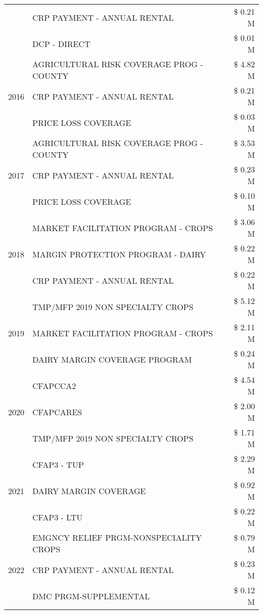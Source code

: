 \begin{tabular}{llr}
 & CRP PAYMENT - ANNUAL RENTAL & \$ 0.21 M \\
 & DCP - DIRECT & \$ 0.01 M \\
\cline{1-3}
\multirow[t]{3}{*}{2016} & AGRICULTURAL RISK COVERAGE PROG - COUNTY & \$ 4.82 M \\
 & CRP PAYMENT - ANNUAL RENTAL & \$ 0.21 M \\
 & PRICE LOSS COVERAGE & \$ 0.03 M \\
\cline{1-3}
\multirow[t]{3}{*}{2017} & AGRICULTURAL RISK COVERAGE PROG - COUNTY & \$ 3.53 M \\
 & CRP PAYMENT - ANNUAL RENTAL & \$ 0.23 M \\
 & PRICE LOSS COVERAGE & \$ 0.10 M \\
\cline{1-3}
\multirow[t]{3}{*}{2018} & MARKET FACILITATION PROGRAM - CROPS & \$ 3.06 M \\
 & MARGIN PROTECTION PROGRAM - DAIRY & \$ 0.22 M \\
 & CRP PAYMENT - ANNUAL RENTAL & \$ 0.22 M \\
\cline{1-3}
\multirow[t]{3}{*}{2019} & TMP/MFP 2019 NON SPECIALTY CROPS & \$ 5.12 M \\
 & MARKET FACILITATION PROGRAM - CROPS & \$ 2.11 M \\
 & DAIRY MARGIN COVERAGE PROGRAM & \$ 0.24 M \\
\cline{1-3}
\multirow[t]{3}{*}{2020} & CFAPCCA2 & \$ 4.54 M \\
 & CFAPCARES & \$ 2.00 M \\
 & TMP/MFP 2019 NON SPECIALTY CROPS & \$ 1.71 M \\
\cline{1-3}
\multirow[t]{3}{*}{2021} & CFAP3 - TUP & \$ 2.29 M \\
 & DAIRY MARGIN COVERAGE & \$ 0.92 M \\
 & CFAP3 - LTU & \$ 0.22 M \\
\cline{1-3}
\multirow[t]{3}{*}{2022} & EMGNCY RELIEF PRGM-NONSPECIALITY CROPS & \$ 0.79 M \\
 & CRP PAYMENT - ANNUAL RENTAL & \$ 0.23 M \\
 & DMC PRGM-SUPPLEMENTAL & \$ 0.12 M \\
\cline{1-3}
\bottomrule
\end{tabular}
